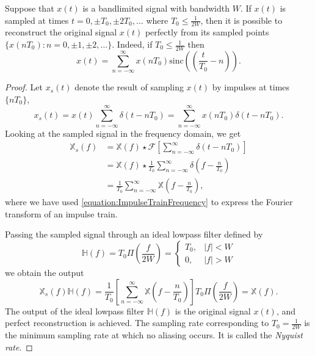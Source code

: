 \begin{theorem} \label{theorem:SamplingTheorem}
Suppose that $x(t)$ is a bandlimited signal with bandwidth $W$.
If $x(t)$ is sampled at times $t = 0, \pm T_0, \pm 2T_0, \ldots$ where $T_0 \leq \frac{1}{2W}$, then it is possible to reconstruct the original signal $x(t)$ perfectly from its sampled points $\{ x(nT_0) : n = 0, \pm 1, \pm 2, \ldots \}$.
Indeed, if $T_0 \leq \frac{1}{2W}$ then
\begin{equation*}
x(t) = \sum_{n = -\infty}^{\infty}
x(nT_0) \mathrm{sinc} \left( \left( \frac{t}{T_0}-n \right) \right) .
\end{equation*}
\end{theorem}
\begin{proof}
Let $x_{s}(t)$ denote the result of sampling $x(t)$ by impulses at times $\{ nT_0 \}$,
\begin{equation*}
x_s(t) = x(t) \sum_{n=-\infty}^{\infty} \delta(t-nT_0)
= \sum_{n=-\infty}^{\infty} x(nT_0) \delta(t-nT_0).
\end{equation*}
Looking at the sampled signal in the frequency domain, we get
\begin{equation*}
\begin{split}
\mathbb{X}_s(f) &= \mathbb{X}(f) \star \mathcal{F} \left[ \sum_{n=-\infty}^{\infty} \delta(t-nT_0) \right] \\
&= \mathbb{X}(f) \star \frac{1}{T_0} \sum_{n=-\infty}^{\infty} \delta \left( f-\frac{n}{T_0} \right) \\
&= \frac{1}{T_0} \sum_{n=-\infty}^{\infty} \mathbb{X} \left( f - \frac{n}{T_0} \right) ,
\end{split}
\end{equation*}
where we have used \eqref{equation:ImpulseTrainFrequency} to express the Fourier transform of an impulse train.

Passing the sampled signal through an ideal lowpass filter defined by
\begin{equation*}
\mathbb{H}(f) = T_0 \Pi \left( \frac{f}{2W} \right)
= \begin{cases} T_0, & |f| < W \\
0, & |f| > W \end{cases}
\end{equation*}
we obtain the output
\begin{equation*}
\mathbb{X}_s(f) \mathbb{H}(f)
= \frac{1}{T_0} \left[ \sum_{n=-\infty}^{\infty} \mathbb{X} \left( f - \frac{n}{T_0} \right) \right]
T_0 \Pi \left( \frac{f}{2W} \right)
= \mathbb{X}(f) .
\end{equation*}
The output of the ideal lowpass filter $\mathbb{H}(f)$ is the original signal $x(t)$, and perfect reconstruction is achieved.
The sampling rate corresponding to $T_0 = \frac{1}{2W}$ is the minimum sampling rate at which no aliasing occurs.
It is called the \emph{Nyquist rate}.
\end{proof}

